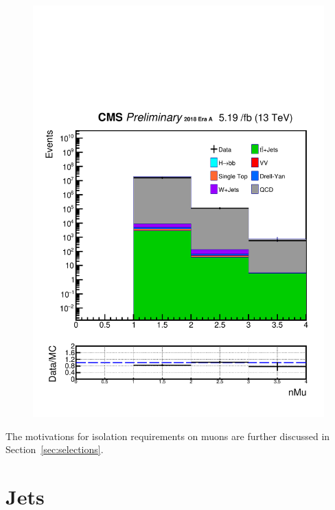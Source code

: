 \begin{figure}[h!]
  \includegraphics[width=0.47\linewidth]{figs/Data_log_AnalysisNote_MS-15_ctauS-10_nMu.pdf}
\end{figure}

The motivations for isolation requirements on muons are further discussed in Section~\ref{sec:selections}.


\section{Jets}\label{sec:jets}

